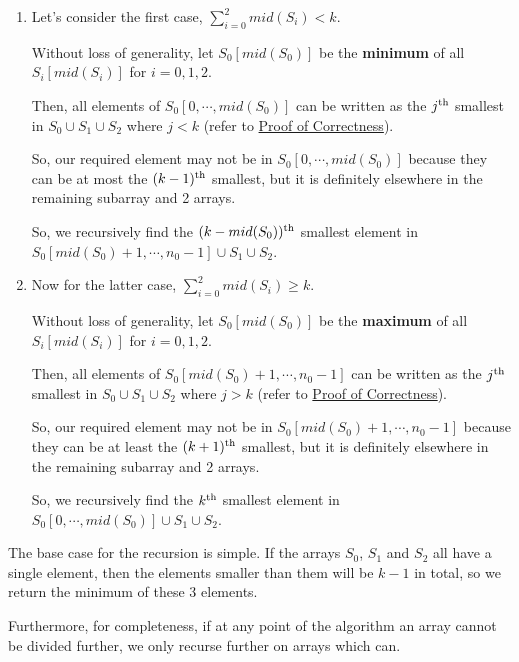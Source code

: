 \documentclass{article}
\begin{document}
\begin{enumerate}

\item Let's consider the first case, $\sum_{i=0}^{2} mid(S_i) < k$.

    Without loss of generality, let $S_0[mid(S_0)]$ be the \textbf{minimum} of all $S_i[mid(S_i)]$ for $i=0,1,2$.

        Then, all elements of $S_0[0, \cdots, mid(S_0)]$ can be written as the $j\textsuperscript{th}$ smallest in $S_0 \cup S_1 \cup S_2$ where $j < k$ (refer to \hyperlink{section.7}{Proof of Correctness}).

        So, our required element may not be in $S_0[0, \cdots, mid(S_0)]$ because they can be at most the $(k-1)\textsuperscript{th}$ smallest, but it is definitely elsewhere in the remaining subarray and 2 arrays.

        So, we recursively find the $(k - mid(S_0))\textsuperscript{th}$ smallest element in $S_0[mid(S_0) + 1, \cdots, n_0 - 1] \cup S_1 \cup S_2$.

\item Now for the latter case, $\sum_{i=0}^{2} mid(S_i) \geq k$.

    Without loss of generality, let $S_0[mid(S_0)]$ be the \textbf{maximum} of all $S_i[mid(S_i)]$ for $i=0,1,2$.

        Then, all elements of $S_0[mid(S_0) + 1, \cdots, n_0 - 1]$ can be written as the $j\textsuperscript{th}$ smallest in $S_0 \cup S_1 \cup S_2$ where $j > k$ (refer to \hyperlink{section.7}{Proof of Correctness}).

        So, our required element may not be in $S_0[mid(S_0) + 1, \cdots, n_0 - 1]$ because they can be at least the $(k+1)\textsuperscript{th}$ smallest, but it is definitely elsewhere in the remaining subarray and 2 arrays.

        So, we recursively find the $k\textsuperscript{th}$ smallest element in $S_0[0, \cdots, mid(S_0)] \cup S_1 \cup S_2$.

\end{enumerate}

The base case for the recursion is simple. If the arrays $S_0$, $S_1$ and $S_2$ all have a single element, then the elements smaller than them will be $k-1$ in total, so we return the minimum of these 3 elements.

Furthermore, for completeness, if at any point of the algorithm an array cannot be divided further, we only recurse further on arrays which can.
\end{document}
